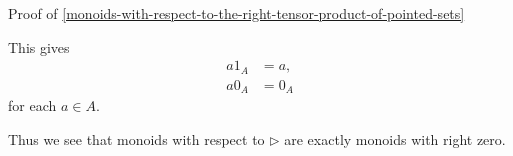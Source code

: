 \begin{Proof}{Proof of \cref{monoids-with-respect-to-the-right-tensor-product-of-pointed-sets}}
\begin{enumerate}
\begin{enumerate}
\begin{webcompile}
                    \end{webcompile}
            \end{enumerate}
            This gives
            \begin{align*}
                a1_{A} &= a,\\
                a0_{A} &= 0_{A}
            \end{align*}
            for each $a\in A$.
    \end{enumerate}
    Thus we see that monoids with respect to $\rhd$ are exactly monoids with right zero.


\end{Proof}
